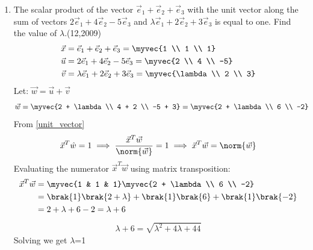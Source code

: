 \begin{enumerate}[label=\thesubsection.\arabic*, ref=\thesubsection.\theenumi]
 \item The scalar product of the vector $\vec{e}_1 + \vec{e}_2 + \vec{e}_3$ with the unit vector along the sum of vectors $2\vec{e}_1 + 4\vec{e}_2- 5\vec{e}_3$ and $\lambda \vec{e}_1 + 2\vec{e}_2 + 3\vec{e}_3$ is equal to one. Find the value of $\lambda$.\hfill{(12,2009)} \\
 \solution
 \begin{align}
 	\vec{x} &= \vec{e}_1 + \vec{e}_2 + \vec{e}_3 = \myvec{1 \\ 1 \\ 1}
 	\\
 	\vec{u} &= 2\vec{e}_1 + 4\vec{e}_2 - 5\vec{e}_3 = \myvec{2 \\ 4 \\ -5}
 	\\
 	\vec{v} &= \lambda \vec{e}_1 + 2\vec{e}_2 + 3\vec{e}_3 = \myvec{\lambda \\ 2 \\ 3}
 \end{align}
 Let: $\vec{w} = \vec{u} + \vec{v}$
 \begin{align}
 \vec{w} &= \myvec{2 + \lambda \\ 4 + 2 \\ -5 + 3} = \myvec{2 + \lambda \\ 6 \\ -2}
 \label{eq:EE26BTECH11202-sum_vector}
 \end{align}
 From \eqref{unit_vector}
\begin{align}
	\vec{x}^T \hat{w} = 1 \implies \frac{\vec{x}^T \vec{w}}{\norm{\vec{w}}} = 1 \implies \vec{x}^T \vec{w} = \norm{\vec{w}}
	\label{eq:EE26BTECH11202-projection_cond}
\end{align}
Evaluating the numerator $\vec{x}^T \vec{w}$ using matrix transposition:
\begin{align}
	\vec{x}^T \vec{w} &= \myvec{1 & 1 & 1} \myvec{2 + \lambda \\ 6 \\ -2}
	\\
	&= \brak{1}\brak{2 + \lambda} + \brak{1}\brak{6} + \brak{1}\brak{-2}
	\\
	&= 2 + \lambda + 6 - 2 = \lambda + 6
	\label{eq:EE26BTECH11202-dot_eval}
\end{align}
\begin{align}
	\lambda + 6 = \sqrt{\lambda^2 + 4\lambda + 44}
\end{align}
Solving we get $\lambda$=1


\end{enumerate}
